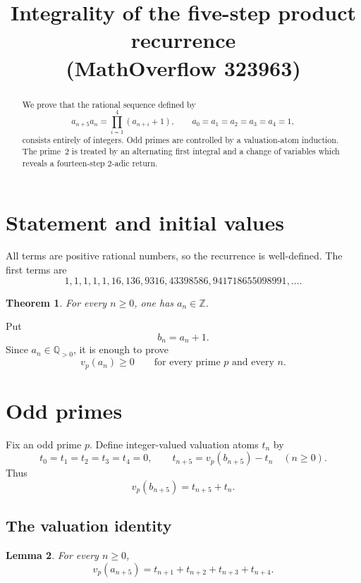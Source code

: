 \documentclass[11pt]{article}
\title{Integrality of the five-step product recurrence\\
       (MathOverflow 323963)}
\author{}
\date{}
\newtheorem{theorem}{Theorem}
\newtheorem{lemma}[theorem]{Lemma}
\theoremstyle{remark}
\newcommand{\Q}{\mathbb Q}
\newcommand{\Z}{\mathbb Z}
\newcommand{\vp}{v_p}
\begin{document}
\maketitle

\begin{abstract}
We prove that the rational sequence defined by
\[
 a_{n+5}a_n=\prod_{i=1}^{4}(a_{n+i}+1),
 \qquad a_0=a_1=a_2=a_3=a_4=1,
\]
consists entirely of integers.  Odd primes are controlled by a valuation-atom
induction.  The prime~2 is treated by an alternating first integral and a
change of variables which reveals a fourteen-step $2$-adic return.
\end{abstract}

\section{Statement and initial values}

All terms are positive rational numbers, so the recurrence is well-defined.
The first terms are
\[
1,1,1,1,1,16,136,9316,43398586,941718655098991,\ldots.
\]

\begin{theorem}\label{thm:main}
For every $n\geq 0$, one has $a_n\in\Z$.
\end{theorem}

Put
\[
 b_n=a_n+1.
\]
Since $a_n\in\Q_{>0}$, it is enough to prove
\[
 v_p(a_n)\geq 0
 \qquad\text{for every prime $p$ and every $n$.}                 \tag{1}
\]

\section{Odd primes}

Fix an odd prime $p$.  Define integer-valued valuation atoms $t_n$ by
\[
 t_0=t_1=t_2=t_3=t_4=0,
 \qquad
 t_{n+5}=\vp(b_{n+5})-t_n\quad(n\geq0).                         \tag{2}
\]
Thus
\[
 \vp(b_{n+5})=t_{n+5}+t_n.                                     \tag{3}
\]

\subsection{The valuation identity}

\begin{lemma}\label{lem:odd-identity}
For every $n\geq0$,
\[
 \vp(a_{n+5})=t_{n+1}+t_{n+2}+t_{n+3}+t_{n+4}.                 \tag{4}
\]
\end{lemma}
\end{document}

